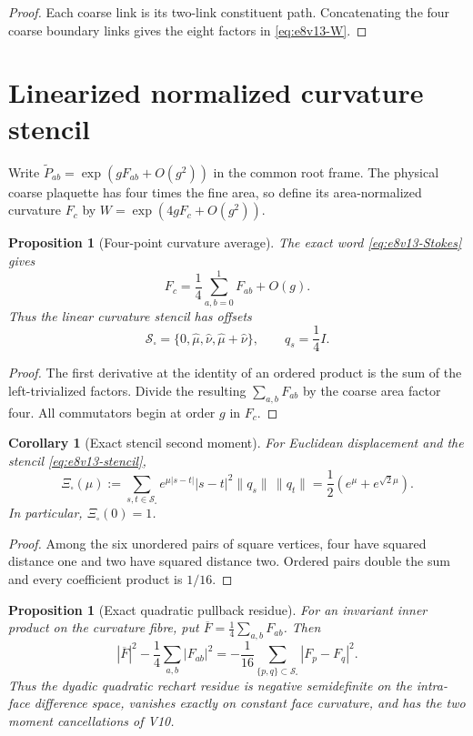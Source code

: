 \documentclass[11pt,oneside]{book}
\newtheorem{proposition}[theorem]{Proposition}
\newtheorem{corollary}[theorem]{Corollary}
\theoremstyle{definition}
\theoremstyle{remark}
\begin{document}
\begin{proof}
Each coarse link is its two-link constituent path.  Concatenating the
four coarse boundary links gives the eight factors in
\eqref{eq:e8v13-W}.
\end{proof}

\section{Linearized normalized curvature stencil}
\label{sec:e8v13-curvature}

Write
\(\widetilde P_{ab}=\exp(gF_{ab}+O(g^2))\) in the common root frame.
The physical coarse plaquette has four times the fine area, so define
its area-normalized curvature \(F_c\) by
\(W=\exp(4gF_c+O(g^2))\).

\begin{proposition}[Four-point curvature average]
\label{prop:e8v13-average}
The exact word \eqref{eq:e8v13-Stokes} gives
\[
 F_c=\frac14\sum_{a,b=0}^1F_{ab}+O(g).              \label{eq:e8v13-average}
\]
Thus the linear curvature stencil has offsets
\[
 {\mathcal S}_\square=\{0,\widehat\mu,\widehat\nu,
 \widehat\mu+\widehat\nu\},\qquad q_s=\frac14I.      \label{eq:e8v13-stencil}
\]
\end{proposition}

\begin{proof}
The first derivative at the identity of an ordered product is the
sum of the left-trivialized factors.  Divide the resulting
\(\sum_{a,b}F_{ab}\) by the coarse area factor four.  All commutators
begin at order \(g\) in \(F_c\).
\end{proof}

\begin{corollary}[Exact stencil second moment]
\label{cor:e8v13-Xi}
For Euclidean displacement and the stencil
\eqref{eq:e8v13-stencil},
\[
 \Xi_\square(\mu)
 :=\sum_{s,t\in{\mathcal S}_\square}
 e^{\mu|s-t|}|s-t|^2\|q_s\|\,\|q_t\|
 =
 \frac12\left(e^\mu+e^{\sqrt2\mu}\right).           \label{eq:e8v13-Xi}
\]
In particular, \(\Xi_\square(0)=1\).
\end{corollary}

\begin{proof}
Among the six unordered pairs of square vertices, four have squared
distance one and two have squared distance two.  Ordered pairs double
the sum and every coefficient product is \(1/16\).
\end{proof}

\begin{proposition}[Exact quadratic pullback residue]
\label{prop:e8v13-quadratic-residue}
For an invariant inner product on the curvature fibre, put
\(\overline F=\frac14\sum_{a,b}F_{ab}\).  Then
\[
 |\overline F|^2-\frac14\sum_{a,b}|F_{ab}|^2
 =
 -\frac1{16}
 \sum_{\{p,q\}\subset{\mathcal S}_\square}
 |F_p-F_q|^2.                                       \label{eq:e8v13-pair-difference}
\]
Thus the dyadic quadratic rechart residue is negative semidefinite on
the intra-face difference space, vanishes exactly on constant face
curvature, and has the two moment cancellations of V10.
\end{proposition}
\end{document}
